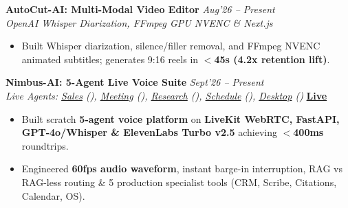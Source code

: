 \documentclass[10pt,a4paper]{article}
\begin{document}
\begin{minipage}[t]{0.488\textwidth}
    \vspace{0.8pt}\vspace{1.2pt}
    \noindent\textbf{AutoCut-AI: Multi-Modal Video Editor} \hfill {\footnotesize\textit{Aug'26 -- Present}}\\
    \textit{OpenAI Whisper Diarization, FFmpeg GPU NVENC \& Next.js} \href{https://github.com/KishorKumarParoi/autocut-ai}{\faGithub}
    \begin{itemize}
        \item Built Whisper diarization, silence/filler removal, and FFmpeg NVENC animated subtitles; generates 9:16 reels in \textbf{$<$45s (4.2x retention lift)}.
    \end{itemize}

    \vspace{0.8pt}\vspace{1.2pt}
    \noindent\textbf{Nimbus-AI: 5-Agent Live Voice Suite} \hfill {\footnotesize\textit{Sept'26 -- Present}}\\
    \textit{Live Agents: \href{https://sales.kishor.tech/}{Sales} (\href{https://github.com/KishorKumarParoi/sales-voice-agent}{\faGithub}), \href{https://meeting.kishor.tech/}{Meeting} (\href{https://github.com/KishorKumarParoi/meeting-voice-agent}{\faGithub}), \href{https://research.kishor.tech/}{Research} (\href{https://github.com/KishorKumarParoi/research-voice-agent}{\faGithub}), \href{https://scheduling.kishor.tech/}{Schedule} (\href{https://github.com/KishorKumarParoi/scheduling-voice-agent}{\faGithub}), \href{https://desktop.kishor.tech/}{Desktop} (\href{https://github.com/KishorKumarParoi/desktop-voice-agent}{\faGithub})} \href{https://nimbus.kishor.tech/}{\textbf{Live}} \href{https://github.com/KishorKumarParoi/nimbus-voice-agents-suite}{\faGithub}
    \begin{itemize}
        \item Built scratch \textbf{5-agent voice platform} on \textbf{LiveKit WebRTC, FastAPI, GPT-4o/Whisper \& ElevenLabs Turbo v2.5} achieving \textbf{$<$400ms} roundtrips.
        \item Engineered \textbf{60fps audio waveform}, instant barge-in interruption, RAG vs RAG-less routing \& 5 production specialist tools (CRM, Scribe, Citations, Calendar, OS).
    \end{itemize}


\end{minipage}
\end{document}
